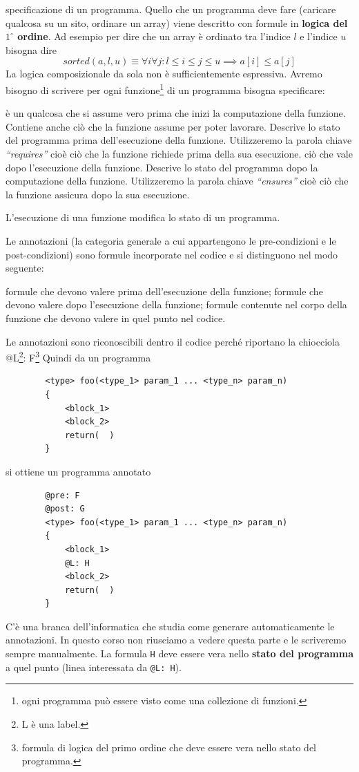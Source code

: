 \begin{enumerate}
	specificazione di un programma. Quello che un programma deve fare (caricare qualcosa su un sito, ordinare un array) viene descritto con formule in \textbf{logica del $1^\circ$ ordine}. Ad esempio per dire che un array è ordinato tra l'indice $l$ e l'indice $u$ bisogna dire $$sorted(a,l,u)\equiv\forall i\forall j\colon l\le i\le j\le u \implies a[i]\le a[j] $$ La logica composizionale da sola non è sufficientemente espressiva. Avremo bisogno di scrivere per ogni funzione\footnote{ogni programma può essere visto come una collezione di funzioni.} di un programma bisogna specificare:
	\begin{enumerate}
		  è un qualcosa che si assume vero prima che inizi la computazione della funzione. Contiene anche ciò che la funzione assume per poter lavorare. Descrive lo stato del programma prima dell'esecuzione della funzione. Utilizzeremo la parola chiave \textit{``requires''} cioè ciò che la funzione richiede prima della sua esecuzione.
		 ciò che vale dopo l'esecuzione della funzione. Descrive lo stato del programma dopo la computazione della funzione. Utilizzeremo la parola chiave \textit{``ensures''} cioè ciò che la funzione assicura dopo la sua esecuzione.
	\end{enumerate}
	L'esecuzione di una funzione modifica lo stato di un programma. 
	
	Le annotazioni (la categoria generale a cui appartengono le pre-condizioni e le post-condizioni) sono formule incorporate nel codice e si distinguono nel modo seguente:
	\begin{itemize}
		  formule che devono valere prima dell'esecuzione della funzione;
		 formule che devono valere dopo l'esecuzione della funzione;
		 formule contenute nel corpo della funzione che devono valere in quel punto nel codice.
	\end{itemize}
	
	Le annotazioni sono riconoscibili dentro il codice perché riportano la chiocciola @L\footnote{L è una label.}: F\footnote{formula di logica del primo ordine che deve essere vera nello stato del programma.}
	Quindi da un programma 
	\begin{lstlisting}
		<type> foo(<type_1> param_1 ... <type_n> param_n)
		{
			<block_1>
			<block_2>
			return(  )  
		}
	\end{lstlisting}
	si ottiene un programma annotato
	\begin{lstlisting}
		@pre: F
		@post: G
		<type> foo(<type_1> param_1 ... <type_n> param_n)
		{
			<block_1>
			@L: H 
			<block_2>
			return(  )  
		}
	\end{lstlisting}
	C'è una branca dell'informatica che studia come generare automaticamente le annotazioni. In questo corso non riusciamo a vedere questa parte e le scriveremo sempre manualmente. La formula \texttt{H} deve essere vera nello \textbf{stato del programma} a quel punto (linea interessata da \texttt{@L: H}).

\end{enumerate}
